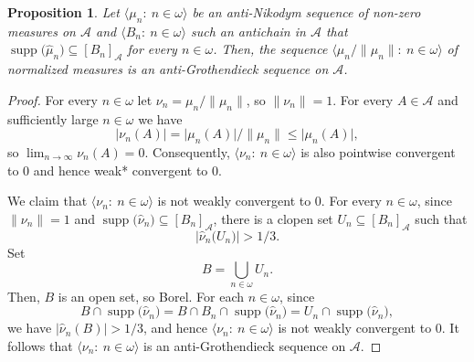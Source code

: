 \documentclass[a4paper,11pt,fleqn]{amsart}
\newtheorem{proposition}[theorem]{Proposition}
\theoremstyle{definition}
\theoremstyle{remark}
\numberwithin{equation}{section}
\newcommand{\eps}{\varepsilon}
\newcommand{\N}{\mathbb{N}}
\newcommand{\aA}{\mathcal{A}}
\newcommand{\rstr}{\restriction}
\newcommand{\sm}{\setminus}
\newcommand{\sub}{\subseteq}
\DeclareMathOperator{\supp}{supp}
\newcommand{\wh}{\widehat}
\newcommand{\seqn}[1]{\big\langle#1\colon\ n\io\big\rangle}
\newcommand{\clopen}[1]{\left[#1\right]}
\newcommand{\iA}{\in\aA}
\newcommand{\io}{\in\omega}%
\begin{document}
\begin{proposition}\label{prop:aN_to_aG}
Let $\seqn{\mu_n}$ be an anti-Nikodym sequence of non-zero measures on $\aA$ and $\seqn{B_n}$ such an antichain in $\aA$ that $\supp\big(\wh{\mu}_n\big)\sub\clopen{B_n}_\aA$ for every $n\io$. %
Then, %
the sequence $\seqn{\mu_n/\big\|\mu_n\big\|}$ of normalized measures is an anti-Grothendieck sequence on $\aA$.
\end{proposition}
\begin{proof}
For every $n\io$ let $\nu_n=\mu_n/\big\|\mu_n\big\|$, so $\big\|\nu_n\big\|=1$. For every $A\iA$ and sufficiently large $n\io$ we have
\[\big|\nu_n(A)\big|=\big|\mu_n(A)\big|/\big\|\mu_n\big\|\le\big|\mu_n(A)\big|,\]
so $\lim_{n\to\infty}\nu_n(A)=0$. Consequently, $\seqn{\nu_n}$ is also pointwise convergent to $0$ and hence weak* convergent to $0$.

We claim that $\seqn{\nu_n}$ is not weakly convergent to $0$. %
%
For every $n\io$, since $\big\|\nu_n\big\|=1$ and $\supp\big(\wh{\nu}_n\big)\sub\clopen{B_n}_\aA$, there is a clopen set $U_n\sub\clopen{B_n}_\aA$ such that
\[\big|\wh{\nu}_n\big(U_n\big)\big|>1/3.\]
Set
\[B=\bigcup_{n\io}U_n.\]
Then, $B$ is an open set, so Borel. For each $n\io$, since
\[B\cap\supp\big(\wh{\nu}_n\big)=B\cap B_n\cap\supp\big(\wh{\nu}_n\big)=U_n\cap\supp\big(\wh{\nu}_n\big),\]%
we have $\big|\wh{\nu}_n(B)\big|>1/3$, and hence $\seqn{\nu_n}$ is not weakly convergent to $0$. It follows that $\seqn{\nu_n}$ is an anti-Grothendieck sequence on $\aA$.
\end{proof}
\end{document}
